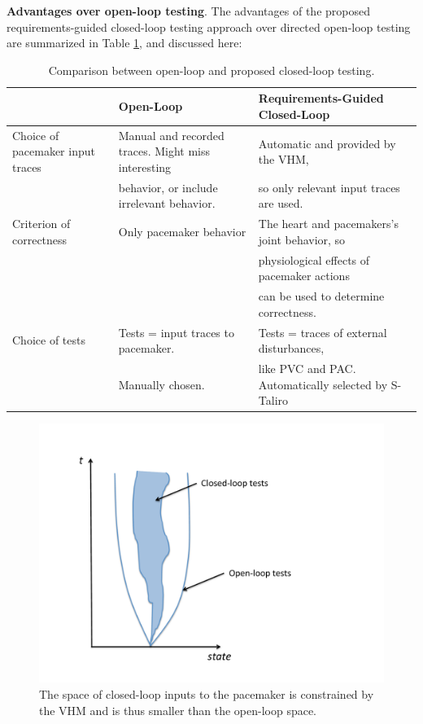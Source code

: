 \textbf{Advantages over open-loop testing}.
The advantages of the proposed requirements-guided closed-loop testing approach over directed open-loop testing are summarized in Table \ref{table:CLoverOL}, and discussed here:
\begin{table}
	\centering
	\caption{Comparison between open-loop and proposed closed-loop testing.}
	\begin{tabular}{|l|l|l|}
	\hline                       & Open-Loop    & Requirements-Guided Closed-Loop 
	\\ 
	\hline Choice of pacemaker input traces  
	                & Manual and recorded traces. Might miss interesting  &  Automatic and provided by the VHM,
	\\ 
					& behavior, or include irrelevant behavior. &  so only relevant input traces are used.
	\\
	\hline Criterion of correctness    & Only pacemaker behavior & The heart and pacemakers's joint behavior, so 
	\\
	                &                  & physiological effects of pacemaker actions
	\\
	                &                  &  can be used to determine correctness.                   
	\\ 
	\hline Choice of tests & Tests = input traces to pacemaker.  & Tests = traces of external disturbances, 
	\\
	                & Manually chosen.  & like PVC and PAC. Automatically selected by S-Taliro
	\\
	\hline 
\end{tabular}
\label{table:CLoverOL}
\end{table}

\begin{figure}[t]
\centering
\includegraphics[scale=0.3]{figures/cone}
\caption{The space of closed-loop inputs to the pacemaker is constrained by the VHM and is thus smaller than the open-loop space.}
\label{fig:cone}
\vspace{-.2cm}
\end{figure}

